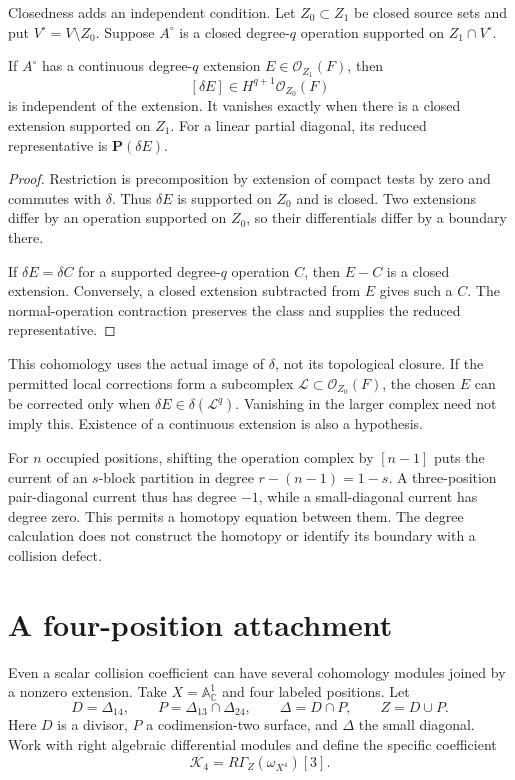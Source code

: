 Closedness adds an independent condition. Let
$Z_0\subset Z_1$ be closed source sets and put
$V^\circ=V\setminus Z_0$. Suppose $A^\circ$ is a closed
degree-$q$ operation supported on $Z_1\cap V^\circ$.

\begin{proposition}\label{mht:prop:supported-extension-obstruction}
If $A^\circ$ has a continuous degree-$q$ extension
$E\in\mathcal O_{Z_1}(F)$, then
\[
 [\delta E]\in H^{q+1}\mathcal O_{Z_0}(F)
\]
is independent of the extension. It vanishes exactly
when there is a closed extension supported on $Z_1$.
For a linear partial diagonal, its reduced representative
is $\mathbf P(\delta E)$.
\end{proposition}
\begin{proof}
Restriction is precomposition by extension of compact
tests by zero and commutes with $\delta$.
Thus $\delta E$ is supported on $Z_0$ and is closed.
Two extensions differ by an operation supported on $Z_0$,
so their differentials differ by a boundary there.

If $\delta E=\delta C$ for a supported degree-$q$
operation $C$, then $E-C$ is a closed extension.
Conversely, a closed extension subtracted from $E$ gives
such a $C$. The normal-operation contraction preserves
the class and supplies the reduced representative.
\end{proof}

This cohomology uses the actual image of $\delta$, not
its topological closure. If the permitted local corrections
form a subcomplex $\mathcal L\subset\mathcal O_{Z_0}(F)$,
the chosen $E$ can be corrected only when
$\delta E\in\delta(\mathcal L^q)$.
Vanishing in the larger complex need not imply this.
Existence of a continuous extension is also a hypothesis.

For $n$ occupied positions, shifting the operation complex
by $[n-1]$ puts the current of an $s$-block partition in
degree $r-(n-1)=1-s$. A three-position pair-diagonal
current thus has degree $-1$, while a small-diagonal
current has degree zero. This permits a homotopy equation
between them. The degree calculation does not construct
the homotopy or identify its boundary with a collision defect.

\section{A four-position attachment}

Even a scalar collision coefficient can have several
cohomology modules joined by a nonzero extension.
Take $X=\mathbb A^1_{\mathbb C}$ and four labeled positions.
Let
\[
 D=\Delta_{14},\qquad P=\Delta_{13}\cap\Delta_{24},
 \qquad \Delta=D\cap P,
 \qquad Z=D\cup P.
\]
Here $D$ is a divisor, $P$ a codimension-two surface,
and $\Delta$ the small diagonal. Work with right algebraic
differential modules and define the specific coefficient
\[
 \mathcal K_4=R\Gamma_Z(\omega_{X^4})[3].
\]

